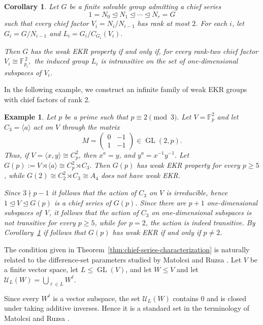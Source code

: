 \documentclass[11pt]{article}
\newtheorem{corollary}[theorem]{Corollary}
\newtheorem{example}[theorem]{Example}
\begin{document}
\begin{corollary}
    

\label{cor:chief-rank-two}
Let \(G\) be a finite solvable group admitting a chief series
\[
1=N_0\trianglelefteq N_1\trianglelefteq\cdots
 \trianglelefteq N_r=G
\]
such that every chief factor
\(
V_i=N_i/N_{i-1}
\)
has rank at most \(2\). For each \(i\), let
\(
G_i=G/N_{i-1}\)
 and
$L_i=G_i/C_{G_i}(V_i).$

Then \(G\) has the weak EKR property if and only if, for every
rank-two chief factor
\(
V_i\cong\mathbb{F}_{p_i}^{\,2},
\)
the induced group \(L_i\) is intransitive on the set of
one-dimensional subspaces of \(V_i\). 
\end{corollary}

In the following example, we construct an infinite family of weak EKR groups with chief factors of rank 2.

\begin{example}
\label{ex:cp2-semidirect-c3}
Let \(p\) be a prime such that
\(
p\equiv 2 \pmod 3.
\)
Let
\(
V=\mathbb{F}_p^2
\)
and let \(C_3=\langle a\rangle\) act on \(V\) through the matrix
\[
M=
\begin{pmatrix}
0 & -1\\
1 & -1
\end{pmatrix}
\in \operatorname{GL}(2,p).
\]
Thus, if \(V=\langle x,y\rangle\cong C_p^2\), then
$x^a=y$, and 
$y^a=x^{-1}y^{-1}.$
 Let
\(
G(p):=V\rtimes\langle a\rangle\cong C_p^2\rtimes C_3.
\) Then $G(p)$ has weak EKR property for every $p\geq 5$, while $G(2)\cong C_2^2 \rtimes C_3 \cong A_4$ does not have weak EKR.

Since \(3\nmid p-1\) it follows that the action of $C_3$ on $V$ is irreducible, hence $1 \trianglelefteq V \trianglelefteq G(p)$ is a chief series of $G(p)$. Since there are $p+1$ one-dimensional subspaces of V, it follows that the action of $C_3$ on one-dimensional subspaces is not transitive for every $p\geq 5$, while for $p=2$, the action is indeed transitive. By Corollary~\ref{cor:chief-rank-two} if follows that $G(p)$ has weak EKR if and only if $p\neq 2$.
\end{example}

The condition given in Theorem~\ref{thm:chief-series-characterization} is naturally related to the difference-set
parameters studied by Matolcsi and Ruzsa \cite{MatolcsiRuzsa2014}. Let \(V\) be a finite vector
space, let \(L\leq \operatorname{GL}(V)\), and let \(W\leq V\) and let $\mathcal{U}_L(W)=\bigcup_{\ell\in L}W^\ell.$

Since every \(W^\ell\) is a vector subspace, the set \(\mathcal{U}_L(W)\)
contains \(0\) and is closed under taking additive inverses. Hence it
is a standard set in the terminology of Matolcsi and Ruzsa \cite{MatolcsiRuzsa2014}.
\end{document}
